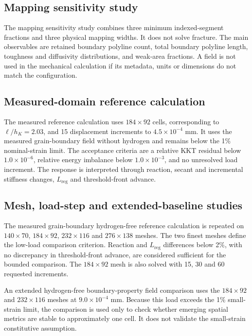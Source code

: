 \documentclass[preprint,12pt]{elsarticle}
\begin{document}
\subsection{Mapping sensitivity study}

The mapping sensitivity study combines three minimum indexed-segment fractions and three physical mapping widths. It does not solve fracture. The main observables are retained boundary polyline count, total boundary polyline length, toughness and diffusivity distributions, and weak-area fractions. A field is not used in the mechanical calculation if its metadata, units or dimensions do not match the configuration.

\subsection{Measured-domain reference calculation}

The measured reference calculation uses \(184\times92\) cells, corresponding to \(\ell/h_K=2.03\), and 15 displacement increments to \(4.5\times10^{-4}\) mm. It uses the measured grain-boundary field without hydrogen and remains below the 1\% nominal-strain limit. The acceptance criteria are a relative KKT residual below \(1.0\times10^{-6}\), relative energy imbalance below \(1.0\times10^{-3}\), and no unresolved load increment. The response is interpreted through reaction, secant and incremental stiffness changes, \(L_{\mathrm{reg}}\) and threshold-front advance.

\subsection{Mesh, load-step and extended-baseline studies}

The measured grain-boundary hydrogen-free reference calculation is repeated on \(140\times70\), \(184\times92\), \(232\times116\) and \(276\times138\) meshes. The two finest meshes define the low-load comparison criterion. Reaction and \(L_{\mathrm{reg}}\) differences below 2\%, with no discrepancy in threshold-front advance, are considered sufficient for the bounded comparison. The \(184\times92\) mesh is also solved with 15, 30 and 60 requested increments.

An extended hydrogen-free boundary-property field comparison uses the \(184\times92\) and \(232\times116\) meshes at \(9.0\times10^{-4}\) mm. Because this load exceeds the 1\% small-strain limit, the comparison is used only to check whether emerging spatial metrics are stable to approximately one cell. It does not validate the small-strain constitutive assumption.
\end{document}
